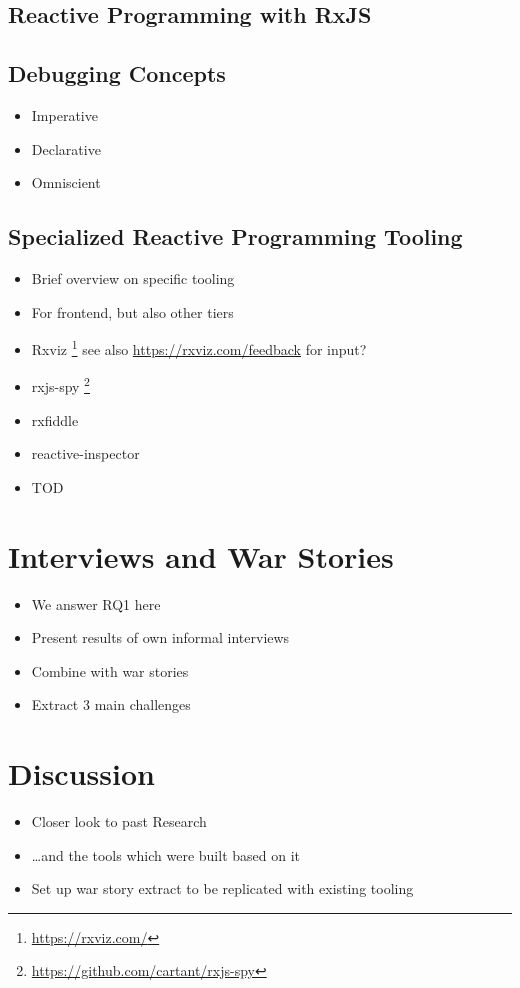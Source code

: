 \documentclass[12pt,a4paper]{article}
\begin{document}
\subsection{Reactive Programming with RxJS}

\subsection{Debugging Concepts}
\begin{itemize}
	\item Imperative
	\item Declarative
	\item Omniscient
\end{itemize}

\subsection{Specialized Reactive Programming Tooling}

\begin{itemize}
	\item Brief overview on specific tooling
	\item For frontend, but also other tiers
	\item Rxviz \footnote{\url{https://rxviz.com/}} see also \url{https://rxviz.com/feedback} for input?
	\item rxjs-spy \footnote{\url{https://github.com/cartant/rxjs-spy}}
	\item rxfiddle \cite{10.1145/3180155.3180156}
	\item reactive-inspector \cite{10.1145/2884781.2884815}
	\item TOD \cite{5287015}
\end{itemize}


\section{Interviews and War Stories}
\begin{itemize}
	\item We answer RQ1 here
	\item Present results of own informal interviews
	\item Combine with war stories
	\item Extract 3 main challenges
\end{itemize}

\section{Discussion}
\begin{itemize}
	\item Closer look to past Research
	\item \dots and the tools which were built based on it
	\item Set up war story extract to be replicated with existing tooling
\end{itemize}
\end{document}

